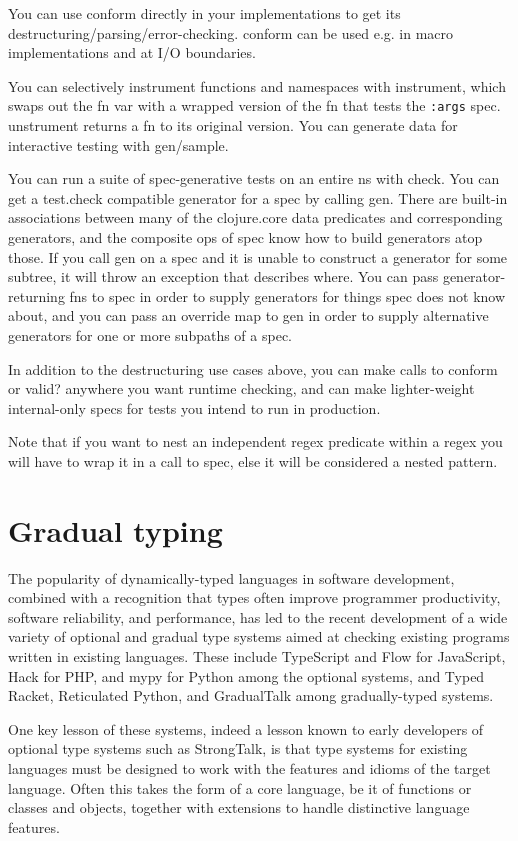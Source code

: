 You can use conform directly in your implementations to get its
destructuring/parsing/error-checking. conform can be used e.g. in macro
implementations and at I/O boundaries.

You can selectively instrument functions and namespaces with instrument, which
swaps out the fn var with a wrapped version of the fn that tests the
\texttt{:args} spec. unstrument returns a fn to its original version. You can
generate data for interactive testing with gen/sample.

You can run a suite of spec-generative tests on an entire ns with check. You can
get a test.check compatible generator for a spec by calling gen. There are
built-in associations between many of the clojure.core data predicates and
corresponding generators, and the composite ops of spec know how to build
generators atop those. If you call gen on a spec and it is unable to construct a
generator for some subtree, it will throw an exception that describes where. You
can pass generator-returning fns to spec in order to supply generators for
things spec does not know about, and you can pass an override map to gen in
order to supply alternative generators for one or more subpaths of a spec.

In addition to the destructuring use cases above, you can make calls to conform
or valid? anywhere you want runtime checking, and can make lighter-weight
internal-only specs for tests you intend to run in production.

Note that if you want to nest an independent regex predicate within a regex you
will have to wrap it in a call to spec, else it will be considered a nested
pattern.


\section{Gradual typing}
The popularity of dynamically-typed languages in software development, combined
with a recognition that types often improve programmer productivity, software
reliability, and performance, has led to the recent development of a wide
variety of optional and gradual type systems aimed at checking existing programs
written in existing languages. These include TypeScript and Flow for JavaScript,
Hack for PHP, and mypy for Python among the optional systems, and Typed Racket,
Reticulated Python, and GradualTalk among gradually-typed systems.

One key lesson of these systems, indeed a lesson known to early developers of
optional type systems such as StrongTalk, is that type systems for existing
languages must be designed to work with the features and idioms of the target
language. Often this takes the form of a core language, be it of functions or
classes and objects, together with extensions to handle distinctive language
features.

